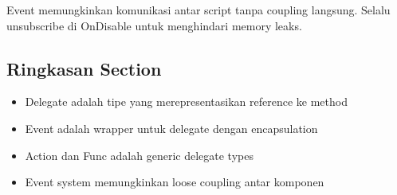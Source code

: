\begin{catatan}
Event memungkinkan komunikasi antar script tanpa coupling langsung. Selalu unsubscribe di OnDisable untuk menghindari memory leaks.
\end{catatan}

\subsection{Ringkasan Section}

\begin{itemize}
\item Delegate adalah tipe yang merepresentasikan reference ke method
\item Event adalah wrapper untuk delegate dengan encapsulation
\item Action dan Func adalah generic delegate types
\item Event system memungkinkan loose coupling antar komponen
\end{itemize}
